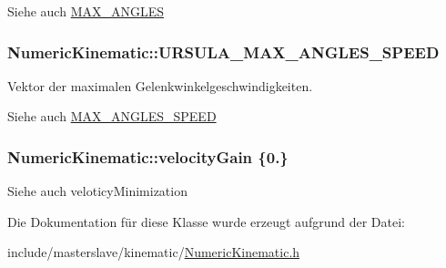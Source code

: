 \begin{DoxySeeAlso}{Siehe auch}
\hyperlink{classNumericKinematic_a146737bc121dfecf585f5dd1012c6fb1}{M\-A\-X\-\_\-\-A\-N\-G\-L\-E\-S} 
\end{DoxySeeAlso}
\hypertarget{classNumericKinematic_af6d15e97e215a9d8e552f1667bb6234f}{
\subsubsection[{U\-R\-S\-U\-L\-A\-\_\-\-M\-A\-X\-\_\-\-A\-N\-G\-L\-E\-S\-\_\-\-S\-P\-E\-E\-D}]{\setlength{\rightskip}{0pt plus 5cm}Numeric\-Kinematic\-::\-U\-R\-S\-U\-L\-A\-\_\-\-M\-A\-X\-\_\-\-A\-N\-G\-L\-E\-S\-\_\-\-S\-P\-E\-E\-D\hspace{0.3cm}{\ttfamily [private]}}}\label{classNumericKinematic_af6d15e97e215a9d8e552f1667bb6234f}


Vektor der maximalen Gelenkwinkelgeschwindigkeiten. 

\begin{DoxySeeAlso}{Siehe auch}
\hyperlink{classNumericKinematic_a2773f8d9aafe634b8f1e7f52142f98e8}{M\-A\-X\-\_\-\-A\-N\-G\-L\-E\-S\-\_\-\-S\-P\-E\-E\-D} 
\end{DoxySeeAlso}
\hypertarget{classNumericKinematic_a3c0bd5b51e9bf070bd2570928feb1cc6}{
\subsubsection[{velocity\-Gain}]{\setlength{\rightskip}{0pt plus 5cm}Numeric\-Kinematic\-::velocity\-Gain \{0.\}\hspace{0.3cm}{\ttfamily [private]}}}\label{classNumericKinematic_a3c0bd5b51e9bf070bd2570928feb1cc6}
\begin{DoxySeeAlso}{Siehe auch}
veloticy\-Minimization 
\end{DoxySeeAlso}


Die Dokumentation für diese Klasse wurde erzeugt aufgrund der Datei\-:\begin{DoxyCompactItemize}
\item 
include/masterslave/kinematic/\hyperlink{NumericKinematic_8h}{Numeric\-Kinematic.\-h}\end{DoxyCompactItemize}
